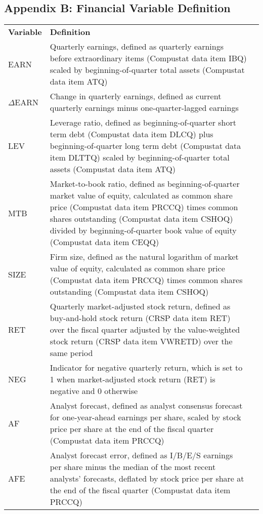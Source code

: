 \documentclass[a4paper]{article}
\begin{document}
\subsection{Appendix B: Financial Variable Definition}
\begin{table}[H]
	\centering
	\begin{tabular}{lp{15cm}p{15cm}}
		\textbf{Variable} & \textbf{Definition} \\
		
		EARN & Quarterly earnings, defined as quarterly earnings before extraordinary items (Compustat data item IBQ) scaled by beginning-of-quarter total assets (Compustat data item ATQ) \\
		$\Delta$EARN & Change in quarterly earnings, defined as current quarterly earnings minus one-quarter-lagged earnings \\
		LEV & Leverage ratio, defined as beginning-of-quarter short term debt (Compustat data item DLCQ) plus beginning-of-quarter long term debt (Compustat data item DLTTQ) scaled by beginning-of-quarter total assets (Compustat data item ATQ) \\
		MTB & Market-to-book ratio, defined as beginning-of-quarter market value of equity, calculated as common share price (Compustat data item PRCCQ) times common shares outstanding (Compustat data item CSHOQ) divided by beginning-of-quarter book value of equity (Compustat data item CEQQ) \\
		SIZE & Firm size, defined as the natural logarithm of market value of equity, calculated as common share price (Compustat data item PRCCQ) times common shares outstanding (Compustat data item CSHOQ) \\
		RET & Quarterly market-adjusted stock return, defined as buy-and-hold stock return (CRSP data item RET) over the fiscal quarter adjusted by the value-weighted stock return (CRSP data item VWRETD) over the same period \\
		NEG & Indicator for negative quarterly return, which is set to 1 when market-adjusted stock return (RET) is negative and 0 otherwise \\
		AF & Analyst forecast, defined as analyst consensus forecast for one-year-ahead earnings per share, scaled by stock price per share at the end of the fiscal quarter (Compustat data item PRCCQ)\\
		AFE & Analyst forecast error, defined as I/B/E/S earnings per share minus the median of the most recent analysts' forecasts, deflated by stock price per share at the end of the fiscal quarter (Compustat data item PRCCQ)\\

\end{tabular}
\end{table}
\end{document}
